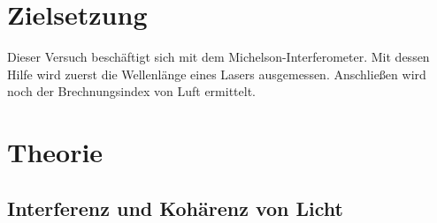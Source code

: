 \section{Zielsetzung}
\label{sec:Zielsetzung}
Dieser Versuch beschäftigt sich mit dem Michelson-Interferometer.
Mit dessen Hilfe wird zuerst die Wellenlänge eines Lasers ausgemessen.
Anschließen wird noch der Brechnungsindex von Luft ermittelt.


\section{Theorie}
\label{sec:Theorie}

\subsection{Interferenz und Kohärenz von Licht}

